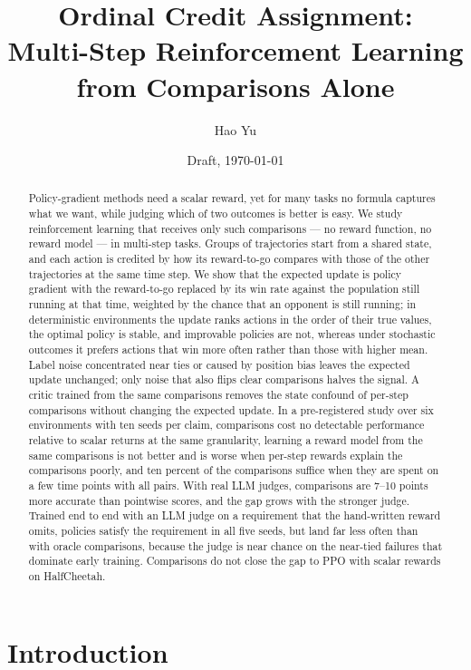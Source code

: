 \documentclass[11pt]{article}
\title{Ordinal Credit Assignment:\\Multi-Step Reinforcement Learning from Comparisons Alone}
\author{Hao Yu \todo{affiliation}}
\date{Draft, \today}
\theoremstyle{remark}
\begin{document}
\maketitle

\begin{abstract}
Policy-gradient methods need a scalar reward, yet for many tasks no formula captures what we want, while judging which of two outcomes is better is easy. We study reinforcement learning that receives only such comparisons --- no reward function, no reward model --- in multi-step tasks. Groups of trajectories start from a shared state, and each action is credited by how its reward-to-go compares with those of the other trajectories at the same time step. We show that the expected update is policy gradient with the reward-to-go replaced by its win rate against the population still running at that time, weighted by the chance that an opponent is still running; in deterministic environments the update ranks actions in the order of their true values, the optimal policy is stable, and improvable policies are not, whereas under stochastic outcomes it prefers actions that win more often rather than those with higher mean. Label noise concentrated near ties or caused by position bias leaves the expected update unchanged; only noise that also flips clear comparisons halves the signal. A critic trained from the same comparisons removes the state confound of per-step comparisons without changing the expected update. In a pre-registered study over six environments with ten seeds per claim, comparisons cost no detectable performance relative to scalar returns at the same granularity, learning a reward model from the same comparisons is not better and is worse when per-step rewards explain the comparisons poorly, and ten percent of the comparisons suffice when they are spent on a few time points with all pairs. With real LLM judges, comparisons are 7--10 points more accurate than pointwise scores, and the gap grows with the stronger judge. Trained end to end with an LLM judge on a requirement that the hand-written reward omits, policies satisfy the requirement in all five seeds, but land far less often than with oracle comparisons, because the judge is near chance on the near-tied failures that dominate early training. Comparisons do not close the gap to PPO with scalar rewards on HalfCheetah.
\end{abstract}

\section{Introduction}
\label{sec:intro}
\end{document}

